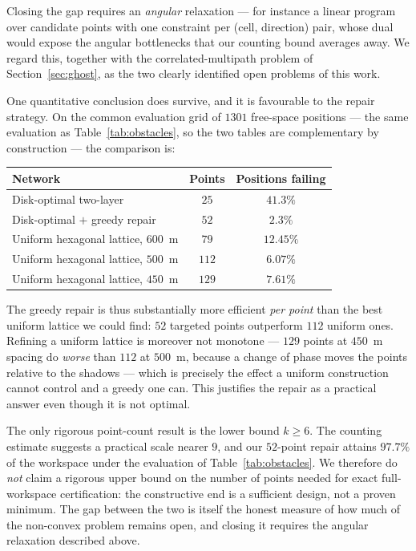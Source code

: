 \documentclass[journal,10pt]{IEEEtran}
\theoremstyle{definition}
\begin{document}
Closing the gap requires an \emph{angular} relaxation --- for instance a linear program over
candidate points with one constraint per (cell, direction) pair, whose dual would expose the
angular bottlenecks that our counting bound averages away. We regard this, together with the
correlated-multipath problem of Section~\ref{sec:ghost}, as the two clearly identified open
problems of this work.

One quantitative conclusion does survive, and it is favourable to the repair strategy. On the
common evaluation grid of $1301$ free-space positions --- the same evaluation as
Table~\ref{tab:obstacles}, so the two tables are complementary by construction --- the comparison
is:

\begin{center}
\small
\begin{tabular}{lcc}
\toprule
Network & Points & Positions failing \\
\midrule
Disk-optimal two-layer              & $25$  & $41.3\%$ \\
Disk-optimal $+$ greedy repair      & $52$  & $\bm{2.3\%}$ \\
Uniform hexagonal lattice, $600$~m  & $79$  & $12.45\%$ \\
Uniform hexagonal lattice, $500$~m  & $112$ & $6.07\%$ \\
Uniform hexagonal lattice, $450$~m  & $129$ & $7.61\%$ \\
\bottomrule
\end{tabular}
\end{center}

The greedy repair is thus substantially more efficient \emph{per point} than the best uniform
lattice we could find: $52$ targeted points outperform $112$ uniform ones. Refining a uniform
lattice is moreover not monotone --- $129$ points at $450$~m spacing do \emph{worse} than $112$ at
$500$~m, because a change of phase moves the points relative to the shadows --- which is precisely
the effect a uniform construction cannot control and a greedy one can. This justifies the repair
as a practical answer even though it is not optimal.

The only rigorous point-count result is the lower bound $k\ge6$. The counting estimate suggests a
practical scale nearer $9$, and our $52$-point repair attains $97.7\%$ of the workspace under the
evaluation of Table~\ref{tab:obstacles}. We therefore do \emph{not} claim a rigorous upper bound
on the number of points needed for exact full-workspace certification: the constructive end is a
sufficient design, not a proven minimum. The gap between the two is itself the honest measure of
how much of the non-convex problem remains open, and closing it requires the angular relaxation
described above.
\end{document}
